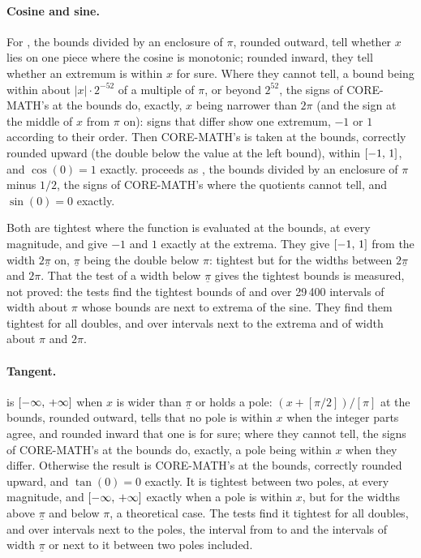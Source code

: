 \documentclass[12pt,a4paper,twoside,openright]{book}
\begin{document}
\paragraph{Cosine and sine.}
For , the bounds divided by an enclosure of $\pi$, rounded
outward, tell whether $x$ lies on one piece where the cosine is monotonic;
rounded inward, they tell whether an extremum is within $x$ for sure. Where
they cannot tell, a bound being within about $|x|\cdot2^{-52}$ of a
multiple of $\pi$, or beyond $2^{52}$, the signs of CORE-MATH's 
at the bounds do, exactly, $x$ being narrower than $2\pi$ (and the sign at
the middle of $x$ from $\pi$ on): signs that differ show one extremum, $-1$
or $1$ according to their order. Then CORE-MATH's  is taken at
the bounds, correctly rounded upward (the double below the value at the
left bound), within $[-1,\,1]$, and $\cos(0)=1$ exactly. 
proceeds as , the bounds divided by an enclosure of $\pi$ minus
$1/2$, the signs of CORE-MATH's  where the quotients cannot tell,
and $\sin(0)=0$ exactly.

Both are tightest where the function is evaluated at the bounds, at every
magnitude, and give $-1$ and $1$ exactly at the extrema. They give
$[-1,\,1]$ from the width $2\underline{\pi}$ on, $\underline{\pi}$ being
the double below $\pi$: tightest but for the widths between
$2\underline{\pi}$ and $2\pi$. That the test of a width below
$\underline{\pi}$ gives the tightest bounds is measured, not proved: the
tests find the tightest bounds of  and  over 29\,400
intervals of width about $\pi$ whose bounds are next to extrema of the
sine. They find them tightest for all doubles, and over intervals next to
the extrema and of width about $\pi$ and $2\pi$.

\paragraph{Tangent.}
 is $[-\infty,\,+\infty]$ when $x$ is wider than
$\underline{\pi}$ or holds a pole: $(x+[\pi/2])/[\pi]$ at the bounds,
rounded outward, tells that no pole is within $x$ when the integer parts
agree, and rounded inward that one is for sure; where they cannot tell, the
signs of CORE-MATH's  at the bounds do, exactly, a pole being
within $x$ when they differ. Otherwise the result is CORE-MATH's 
at the bounds, correctly rounded upward, and $\tan(0)=0$ exactly. It is
tightest between two poles, at every magnitude, and
$[-\infty,\,+\infty]$ exactly when a pole is within $x$, but for the
widths above $\underline{\pi}$ and below $\pi$, a theoretical case. The
tests find it tightest for all doubles, and over intervals next to the
poles, the interval from  to  and the
intervals of width $\underline{\pi}$ or next to it between two poles
included.
\end{document}
